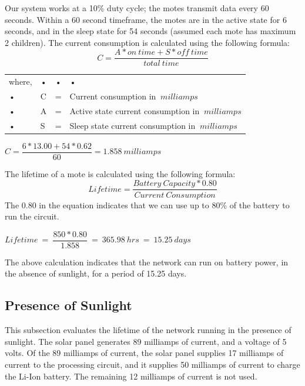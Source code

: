 Our system works at a 10\% duty cycle; the motes transmit data every 60 seconds. Within a 60 second timeframe, the motes are in the active state for 6 seconds, and in the sleep state for 54 seconds (assumed each mote has maximum 2 children). The current consumption is calculated using the following formula:
\begin{equation} \label{equ:current_consumption}
C = \frac{A*on\ time + S*off\ time}{total\ time}
\end{equation}

\begin{tabular}{lllp{10cm}}
where, & • & • & • \\ 
• & C & = & Current consumption in $\ milliamps$ \\ 
• & A & = & Active state current consumption in $\ milliamps$ \\ 
• & S & = & Sleep state current consumption in $\ milliamps$ \\ 
\end{tabular} 

\begin{center}
$C = \dfrac{6*13.00 + 54*0.62}{60} = 1.858 \ milliamps$
\end{center}
The lifetime of a mote is calculated using the following formula:
\begin{equation}
Lifetime = \frac{Battery\ Capacity*0.80}{Current\ Consumption}
\end{equation}
The 0.80 in the equation indicates that we can use up to 80\% of the battery to run the circuit.
\begin{center}
$Lifetime\ =\ \dfrac{850*0.80}{1.858}\ =\ 365.98\ hrs\ =\ 15.25\ days$\\
\end{center}

The above calculation indicates that the network can run on battery power, in the absence of sunlight, for a period of 15.25 days.

\subsection{Presence of Sunlight}\label{subsec:sunlight_present}
This subsection evaluates the lifetime of the network running in the presence of sunlight. The solar panel generates 89 milliamps of current, and a voltage of 5 volts. Of the 89 milliamps of current, the solar panel supplies 17 milliamps of current to the processing circuit, and it supplies 50 milliamps of current to charge the Li-Ion battery. The remaining 12 milliamps of current is not used.

